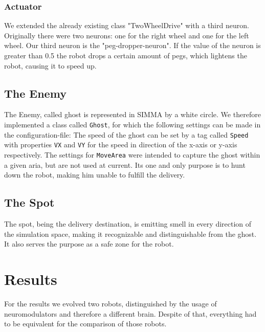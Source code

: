 \documentclass[12pt,fleqn,a4paper]{article}
\begin{document}
\subsubsection{Actuator}
We extended the already existing class "TwoWheelDrive" with a third neuron. Originally there were two neurons: one for the right wheel and one for the left wheel. Our third neuron is the "peg-dropper-neuron". If the value of the neuron is greater than 0.5 the robot drops a certain amount of pegs, which lightens the robot, causing it to speed up.

\subsection{The Enemy}

The Enemy, called ghost is represented in SIMMA by a white circle. We therefore implemented a class called \texttt{Ghost}, for which the following settings can be made in the configuration-file: The speed of the ghost can be set by a tag called \texttt{Speed} with properties \texttt{VX} and \texttt{VY} for the speed in direction of the x-axis or y-axis respectively. The settings for \texttt{MoveArea} were intended to capture the ghost within a given aria, but are not used at current. Its one and only purpose is to hunt down the robot, making him unable to fulfill the delivery.

\subsection{The Spot}
The spot, being the delivery destination, is emitting smell in every direction of the simulation space, making it recognizable and distinguishable from the ghost. It also serves the purpose as a safe zone for the robot.

\newpage
\section{Results}
For the results we evolved two robots, distinguished by the usage of neuromodulators and therefore a different brain. Despite of that, everything had to be equivalent for the comparison of those robots.
\end{document}
